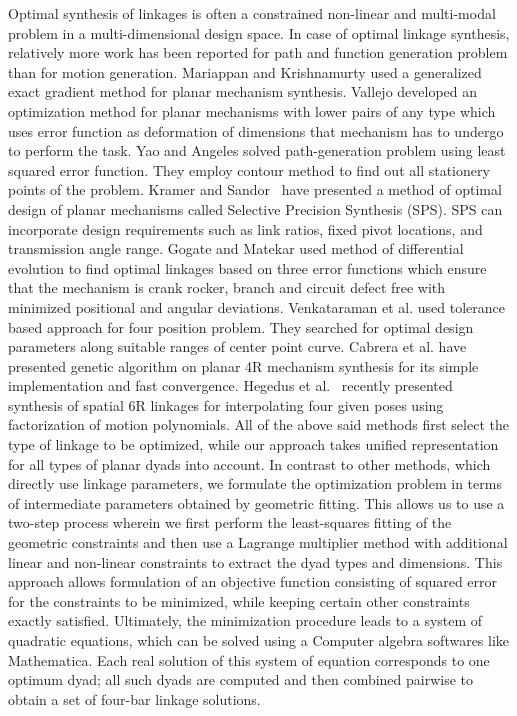 Optimal synthesis of linkages is often a constrained non-linear and multi-modal problem in a multi-dimensional design space. In case of optimal linkage synthesis, relatively more work has been reported for path and function generation problem than for motion generation. Mariappan and Krishnamurty\cite{mariappan1996} used a generalized exact gradient method for planar mechanism synthesis. Vallejo\cite{vallejo1995} developed an optimization method for planar mechanisms with lower pairs of any type which uses error function as deformation of dimensions that mechanism has to undergo to perform the task. Yao and Angeles\cite{YaoAngeles2000} solved path-generation problem using least squared error function. They employ contour method to find out all stationery points of the problem. Kramer and Sandor~\cite{kramer1975} have presented a method of optimal design of planar mechanisms called Selective Precision Synthesis (SPS). SPS can incorporate design requirements such as link ratios, fixed pivot locations, and transmission angle range. Gogate and Matekar \cite{gogate2012} used method of differential evolution to find optimal linkages based on three error functions which ensure that the mechanism is crank rocker, branch and circuit defect free with minimized positional and angular deviations. Venkataraman et al.\cite{Venkataraman1992} used tolerance based approach for four position problem. They searched for optimal design parameters along suitable ranges of center point curve. Cabrera et al.\cite{Cabrera2002} have presented genetic algorithm on planar 4R mechanism synthesis for its simple implementation and fast convergence. Hegedus et al.~\cite{Hegedus2015} recently presented synthesis of spatial 6R linkages for interpolating four given poses using factorization of motion polynomials. All of the above said methods first select the type of linkage to be optimized, while our approach takes unified representation for all types of planar dyads into account. In contrast to other methods, which directly use linkage parameters, we formulate the optimization problem in terms of intermediate parameters obtained by geometric fitting. This allows us to use a two-step process wherein we first perform the least-squares fitting of the geometric constraints and then use a Lagrange multiplier method with additional linear and non-linear constraints to extract the dyad types and dimensions. This approach allows formulation of an objective function consisting of squared error for the constraints to be minimized, while keeping certain other constraints exactly satisfied. Ultimately, the minimization procedure leads to a system of quadratic equations, which can be solved using a Computer algebra softwares like Mathematica. Each real solution of this system of equation corresponds to one optimum dyad; all such dyads are computed and then combined pairwise to obtain a set of four-bar linkage solutions.

